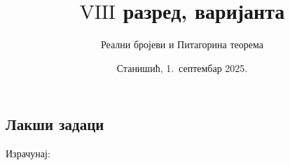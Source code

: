 \documentclass[11pt,a5paper,twoside,addpoints,noanswers]{exam} %
\title{$\mathrm{VIII}$ разред, варијанта \variant{1}{2}{3}}
\author{Реални бројеви и Питагорина теорема}
\date{Станишић, 1.~септембар 2025.}
\newcommand{\variant}[3]{#1}
\begin{document}
\maketitle
\thispagestyle{headandfoot}

\begin{center}
\gradetable[h]
\end{center}

\begin{questions}

\section{Лакши задаци}

\question[2]
Израчунај:
\begin{multicols}{3}
\end{multicols}
\begin{solution}[\stretch 1]
\begin{multicols}{3}
\end{multicols}
\end{solution}


\end{questions}
\end{document}
